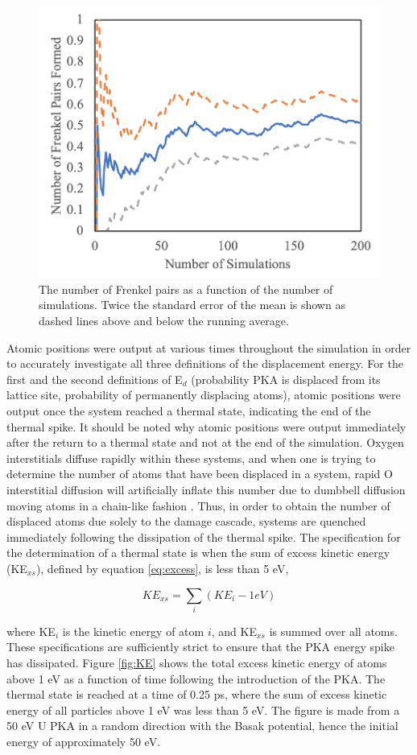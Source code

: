 \documentclass[review]{elsarticle}
\begin{document}
\begin{figure}[h]
\centering
	\includegraphics[width=0.6\linewidth]{converge.png}
	\caption{The number of Frenkel pairs as a function of the number of simulations. Twice the standard error of the mean is shown as dashed lines above and below the running average.}
	\label{fig:converge}
\end{figure}

\FloatBarrier

Atomic positions were output at various times throughout the simulation in order to accurately investigate all three definitions of the displacement energy. For the first and the second definitions of E$_d$ (probability PKA is displaced from its lattice site, probability of permanently displacing atoms), atomic positions were output once the system reached a thermal state, indicating the end of the thermal spike. It should be noted why atomic positions were output immediately after the return to a thermal state and not at the end of the simulation. Oxygen interstitials diffuse rapidly within these systems, and when one is trying to determine the number of atoms that have been displaced in a system, rapid O interstitial diffusion will artificially inflate this number due to dumbbell diffusion moving atoms in a chain-like fashion \cite{ajay}. Thus, in order to obtain the number of displaced atoms due solely to the damage cascade, systems are quenched immediately following the dissipation of the thermal spike. The specification for the determination of a thermal state is when the sum of excess kinetic energy (KE$_{xs}$), defined by equation \ref{eq:excess}, is less than 5 eV,

\begin{equation}
\label{eq:excess}
KE_{xs} = \sum_i (KE_i - 1 eV)
\end{equation}

where KE$_i$ is the kinetic energy of atom $i$, and KE$_{xs}$ is summed over all atoms. These specifications are sufficiently strict to ensure that the PKA energy spike has dissipated. Figure \ref{fig:KE} shows the total excess kinetic energy of atoms above 1 eV as a function of time following the introduction of the PKA. The thermal state is reached at a time of 0.25 ps, where the sum of excess kinetic energy of all particles above 1 eV was less than 5 eV. The figure is made from a 50 eV U PKA in a random direction with the Basak potential, hence the initial energy of approximately 50 eV.
\end{document}
